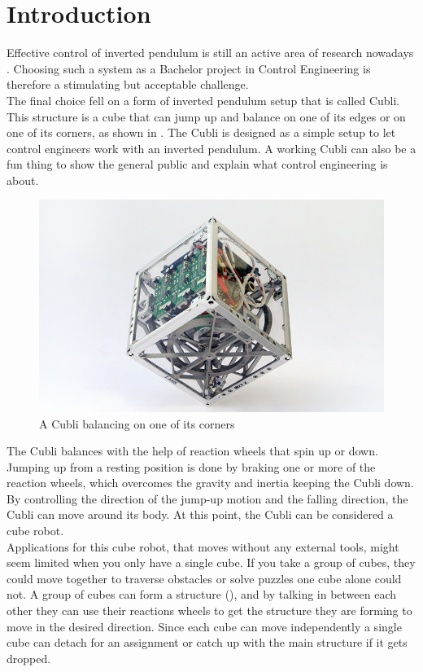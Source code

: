 \chapter{Introduction}
Effective control of inverted pendulum is still an active area of research nowadays \cite{JHuber}. Choosing such a system as a Bachelor project in Control Engineering is therefore a stimulating but acceptable challenge.\\
The final choice fell on a form of inverted pendulum setup that is called Cubli. This structure is a cube that can jump up and balance on one of its edges or on one of its corners, as shown in .
The Cubli is designed as a simple setup to let control engineers work with an inverted pendulum. A working Cubli can also be a fun thing to show the general public and explain what control engineering is about.  \cite{MGajamohan}

\begin{figure}[H] 
	\centering
	\includegraphics[scale=1.3]{figures/CubliCorner-700x430}
	\caption{A Cubli balancing on one of its corners\cite{RAndrea}}
	\label{CubliCorner}
\end{figure} 
The Cubli balances with the help of reaction wheels that spin up or down. Jumping up from a resting position is done by braking one or more of the reaction wheels, which overcomes the gravity and inertia keeping the Cubli down.
By controlling the direction of the jump-up motion and the falling direction, the Cubli can move around its body. At this point, the Cubli can be considered a cube robot.\\
Applications for this cube robot, that moves without any external tools, might seem limited when you only have a single cube. If you take a group of cubes, they could move together to traverse obstacles or solve puzzles one cube alone could not. A group of cubes can form a structure (), and by talking in between each other they can use their reactions wheels to get the structure they are forming to move in the desired direction. Since each cube can move independently a single cube can detach for an assignment or catch up with the main structure if it gets dropped.\cite{JRomanishin}

